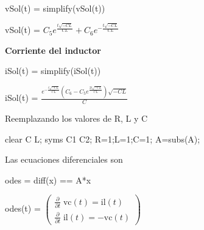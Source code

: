 \documentclass[10pt,a4paper]{article} %
\begin{document}
	\begin{matlabcode}
		vSol(t) = simplify(vSol(t))
	\end{matlabcode}
	\begin{matlabsymbolicoutput}
		vSol(t) = 
		$\displaystyle C_5  e^{\frac{t \sqrt{-C L}}{C L}} +C_6  e^{-\frac{t \sqrt{-C L}}{C L}} $
	\end{matlabsymbolicoutput}
	
	\begin{par}
		\begin{flushleft}
			\textbf{Corriente del inductor}
		\end{flushleft}
	\end{par}
	
	\begin{matlabcode}
		iSol(t) = simplify(iSol(t))
	\end{matlabcode}
	\begin{matlabsymbolicoutput}
		iSol(t) = 
		$\displaystyle \frac{e^{-\frac{t \sqrt{-C L}}{C L}}  {\left(C_6 -C_5  e^{\frac{2 t \sqrt{-C L}}{C L}} \right)} \sqrt{-C L}}{C}$
	\end{matlabsymbolicoutput}
	
	\begin{par}
		\begin{flushleft}
			Reemplazando los valores de R, L y C
		\end{flushleft}
	\end{par}
	
	\begin{matlabcode}
		clear C L;
		syms C1 C2;
		R=1;L=1;C=1;
		A=subs(A);
	\end{matlabcode}
	
	\begin{par}
		\begin{flushleft}
			Las ecuaciones diferenciales son
		\end{flushleft}
	\end{par}
	
	\begin{matlabcode}
		odes = diff(x) == A*x
	\end{matlabcode}
	\begin{matlabsymbolicoutput}
		odes(t) = 
		$\displaystyle \left(\begin{array}{c}
		\frac{\partial }{\partial t}\;\textrm{vc}\left(t\right)=\textrm{il}\left(t\right)\\
		\frac{\partial }{\partial t}\;\textrm{il}\left(t\right)=-\textrm{vc}\left(t\right)
		\end{array}\right)$
	\end{matlabsymbolicoutput}
	
\end{document}
